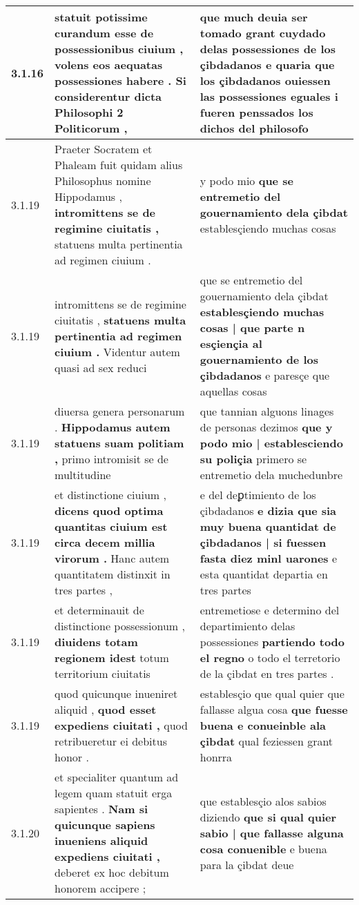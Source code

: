 \begin{tabular}{|p{1cm}|p{6.5cm}|p{6.5cm}|}
3.1.16 & statuit potissime curandum esse de possessionibus ciuium , \textbf{ volens eos aequatas possessiones habere . } Si considerentur dicta Philosophi 2 Politicorum , & que much deuia ser tomado grant cuydado delas possessiones de los çibdadanos \textbf{ e quaria que los çibdadanos ouiessen las possessiones eguales } i fueren penssados los dichos del philosofo \\\hline
3.1.19 & Praeter Socratem et Phaleam fuit quidam alius Philosophus nomine Hippodamus , \textbf{ intromittens se de regimine ciuitatis , } statuens multa pertinentia ad regimen ciuium . & y podo mio \textbf{ que se entremetio del gouernamiento dela çibdat } establesçiendo muchas cosas \\\hline
3.1.19 & intromittens se de regimine ciuitatis , \textbf{ statuens multa pertinentia ad regimen ciuium . } Videntur autem quasi ad sex reduci & que se entremetio del gouernamiento dela çibdat \textbf{ establesçiendo muchas cosas | que parte n esçiençia al gouernamiento de los çibdadanos } e paresçe que aquellas cosas \\\hline
3.1.19 & diuersa genera personarum . \textbf{ Hippodamus autem statuens suam politiam , } primo intromisit se de multitudine & que tannian alguons linages de personas dezimos \textbf{ que y podo mio | establesciendo su poliçia } primero se entremetio dela muchedunbre \\\hline
3.1.19 & et distinctione ciuium , \textbf{ dicens quod optima quantitas ciuium est circa decem millia virorum . } Hanc autem quantitatem distinxit in tres partes , & e del deꝑtimiento de los çibdadanos \textbf{ e dizia que sia muy buena quantidat de çibdadanos | si fuessen fasta diez minl uarones } e esta quantidat departia en tres partes \\\hline
3.1.19 & et determinauit de distinctione possessionum , \textbf{ diuidens totam regionem idest } totum territorium ciuitatis & entremetiose e determino del departimiento delas possessiones \textbf{ partiendo todo el regno } o todo el terretorio de la çibdat en tres partes . \\\hline
3.1.19 & quod quicunque inueniret aliquid , \textbf{ quod esset expediens ciuitati , } quod retribueretur ei debitus honor . & establesçio que qual quier que fallasse algua cosa \textbf{ que fuesse buena e conueinble ala çibdat } qual feziessen grant honrra \\\hline
3.1.20 & et specialiter quantum ad legem quam statuit erga sapientes . \textbf{ Nam si quicunque sapiens inueniens aliquid expediens ciuitati , } deberet ex hoc debitum honorem accipere ; & que establesçio alos sabios diziendo \textbf{ que si qual quier sabio | que fallasse alguna cosa conuenible } e buena para la çibdat deue \\\hline

\end{tabular}
